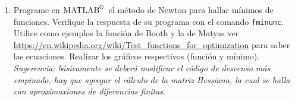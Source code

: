 \documentclass[letterpaper,12pt]{exam}
\newcommand{\matlab}{$\text{MATLAB}^{\text{\textregistered}}$~}
\begin{document}
\begin{enumerate}
 \item Programe en \matlab el método de Newton para hallar mínimos de funciones. Verifique la respuesta de su programa con el comando \texttt{fminunc}. Utilice como ejemplos la función de Booth y la de Matyas ver \url{https://en.wikipedia.org/wiki/Test_functions_for_optimization} para saber las ecuaciones. Realizar los gráficos respectivos (función y mínimo). \emph{Sugerencia: básicamente se deberá modificar el código de descenso más empinado, hay que agregar el cálculo de la matriz Hessiana, la cual se halla con aproximaxiones de diferencias finitas}.

 \end{enumerate}
 
\end{document}
